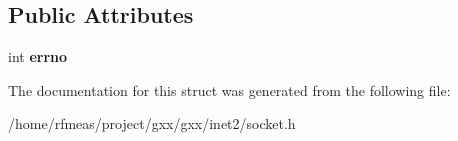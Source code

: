 \subsection*{Public Attributes}
\begin{DoxyCompactItemize}
\item 
int {\bfseries errno}\hypertarget{structgxx_1_1inet2_1_1socket__exception_a9d2060c2d325309f663673736732cced}{}\label{structgxx_1_1inet2_1_1socket__exception_a9d2060c2d325309f663673736732cced}

\end{DoxyCompactItemize}


The documentation for this struct was generated from the following file\+:\begin{DoxyCompactItemize}
\item 
/home/rfmeas/project/gxx/gxx/inet2/socket.\+h\end{DoxyCompactItemize}
